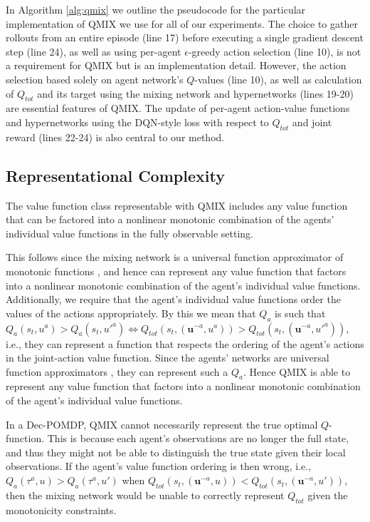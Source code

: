 \documentclass[twoside,11pt]{article}
\renewcommand{\cite}{\citep}
\begin{document}
In Algorithm \ref{alg:qmix} we outline the pseudocode for the particular implementation of QMIX we use for all of our experiments. 
The choice to gather rollouts from an entire episode (line 17) before executing a single gradient descent step (line 24), as well as using per-agent $\epsilon$-greedy action selection (line 10), is not a requirement for QMIX but is an implementation detail. However, the action selection based solely on agent network's $Q$-values (line 10), as well as calculation of $Q_{tot}$ and its target using the mixing network and hypernetworks (lines 19-20) are essential features of QMIX. The update of per-agent action-value functions and hypernetworks using the DQN-style loss with respect to $Q_{tot}$ and joint reward (lines 22-24) is also central to our method.
 
\subsection{Representational Complexity}

The value function class representable with QMIX includes any value function that can be factored into a nonlinear monotonic combination of the agents' individual value functions in the fully observable setting. 

This follows since the mixing network is a universal function approximator of monotonic functions \cite{Dugas_2009}, and hence can represent any value function that factors into a nonlinear monotonic combination of the agent's individual value functions. Additionally, we require that the agent's individual value functions order the values of the actions appropriately. By this we mean that $Q_a$ is such that $Q_a(s_t, u^a) > Q_a(s_t, u'^a) \iff Q_{tot}(s_t, (\mathbf{u}^{-a}, u^a)) > Q_{tot}(s_t, (\mathbf{u}^{-a}, u'^a))$, i.e., they can represent a function that respects the ordering of the agent's actions in the joint-action value function. Since the agents' networks are universal function approximators \cite{pinkus1999approximation}, they can represent such a $Q_a$. Hence QMIX is able to represent any value function that factors into a nonlinear monotonic combination of the agent's individual value functions. 

In a Dec-POMDP, QMIX cannot necessarily represent the true optimal $Q$-function. 
This is because each agent's observations are no longer the full state, and thus they might not be able to distinguish the true state given their local observations. If the agent's value function ordering is then wrong, i.e., $Q_a(\tau^a, u) > Q_a(\tau^a, u')$ when $Q_{tot}(s_t, (\mathbf{u}^{-a}, u)) < Q_{tot}(s_t, (\mathbf{u}^{-a}, u'))$, then the mixing network would be unable to correctly represent $Q_{tot}$ given the monotonicity constraints. 
\end{document}
